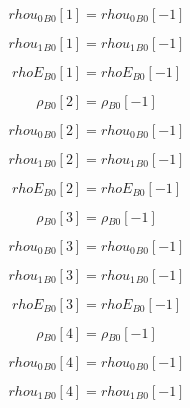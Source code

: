\documentclass{article}
\begin{document}
\begin{dmath}{rhou_{0}{_{B0}}}[{1}] = {rhou_{0}{_{B0}}}[{-1}]\end{dmath}

\begin{dmath}{rhou_{1}{_{B0}}}[{1}] = {rhou_{1}{_{B0}}}[{-1}]\end{dmath}

\begin{dmath}{rhoE{_{B0}}}[{1}] = {rhoE{_{B0}}}[{-1}]\end{dmath}

\begin{dmath}{\rho{_{B0}}}[{2}] = {\rho{_{B0}}}[{-1}]\end{dmath}

\begin{dmath}{rhou_{0}{_{B0}}}[{2}] = {rhou_{0}{_{B0}}}[{-1}]\end{dmath}

\begin{dmath}{rhou_{1}{_{B0}}}[{2}] = {rhou_{1}{_{B0}}}[{-1}]\end{dmath}

\begin{dmath}{rhoE{_{B0}}}[{2}] = {rhoE{_{B0}}}[{-1}]\end{dmath}

\begin{dmath}{\rho{_{B0}}}[{3}] = {\rho{_{B0}}}[{-1}]\end{dmath}

\begin{dmath}{rhou_{0}{_{B0}}}[{3}] = {rhou_{0}{_{B0}}}[{-1}]\end{dmath}

\begin{dmath}{rhou_{1}{_{B0}}}[{3}] = {rhou_{1}{_{B0}}}[{-1}]\end{dmath}

\begin{dmath}{rhoE{_{B0}}}[{3}] = {rhoE{_{B0}}}[{-1}]\end{dmath}

\begin{dmath}{\rho{_{B0}}}[{4}] = {\rho{_{B0}}}[{-1}]\end{dmath}

\begin{dmath}{rhou_{0}{_{B0}}}[{4}] = {rhou_{0}{_{B0}}}[{-1}]\end{dmath}

\begin{dmath}{rhou_{1}{_{B0}}}[{4}] = {rhou_{1}{_{B0}}}[{-1}]\end{dmath}
\end{document}
